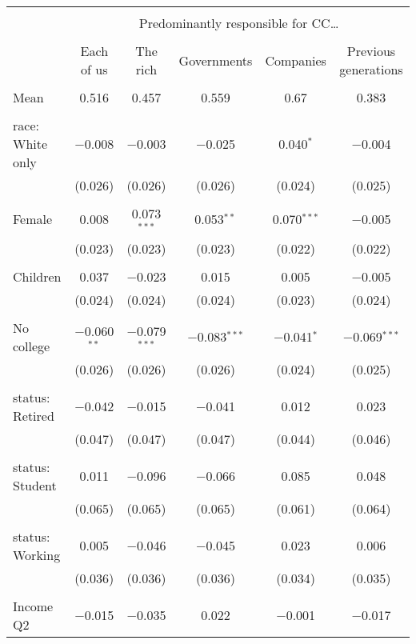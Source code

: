 
\begin{tabular}{@{\extracolsep{5pt}}lccccc} 
\\[-1.8ex]\hline 
\hline \\[-1.8ex] 
 & \multicolumn{5}{c}{Predominantly responsible for CC…} \\ 
\cline{2-6} 
\\[-1.8ex] & Each of us & The rich & Governments & Companies & Previous generations \\ 
\hline \\[-1.8ex] 
 Mean & 0.516 & 0.457 & 0.559 & 0.67 & 0.383  \\ \hline \\[-1.8ex] race: White only & $-$0.008 & $-$0.003 & $-$0.025 & 0.040$^{*}$ & $-$0.004 \\ 
  & (0.026) & (0.026) & (0.026) & (0.024) & (0.025) \\ 
  & & & & & \\ 
 Female & 0.008 & 0.073$^{***}$ & 0.053$^{**}$ & 0.070$^{***}$ & $-$0.005 \\ 
  & (0.023) & (0.023) & (0.023) & (0.022) & (0.022) \\ 
  & & & & & \\ 
 Children & 0.037 & $-$0.023 & 0.015 & 0.005 & $-$0.005 \\ 
  & (0.024) & (0.024) & (0.024) & (0.023) & (0.024) \\ 
  & & & & & \\ 
 No college & $-$0.060$^{**}$ & $-$0.079$^{***}$ & $-$0.083$^{***}$ & $-$0.041$^{*}$ & $-$0.069$^{***}$ \\ 
  & (0.026) & (0.026) & (0.026) & (0.024) & (0.025) \\ 
  & & & & & \\ 
 status: Retired & $-$0.042 & $-$0.015 & $-$0.041 & 0.012 & 0.023 \\ 
  & (0.047) & (0.047) & (0.047) & (0.044) & (0.046) \\ 
  & & & & & \\ 
 status: Student & 0.011 & $-$0.096 & $-$0.066 & 0.085 & 0.048 \\ 
  & (0.065) & (0.065) & (0.065) & (0.061) & (0.064) \\ 
  & & & & & \\ 
 status: Working & 0.005 & $-$0.046 & $-$0.045 & 0.023 & 0.006 \\ 
  & (0.036) & (0.036) & (0.036) & (0.034) & (0.035) \\ 
  & & & & & \\ 
 Income Q2 & $-$0.015 & $-$0.035 & 0.022 & $-$0.001 & $-$0.017 \\ 

\end{tabular}
